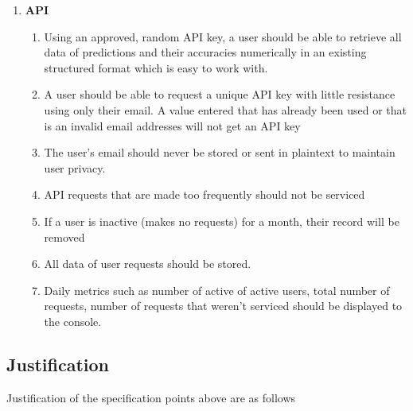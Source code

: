 \begin{enumerate}
        \item \textbf{API}
        
        \begin{enumerate}
            \item Using an approved, random API key, a user should be able to retrieve all data of predictions and their accuracies numerically in an existing structured format which is easy to work with.
            
            \item A user should be able to request a unique API key with little resistance using only their email. A value entered that has already been used or that is an invalid email addresses will not get an API key
            
            \item The user's email should never be stored or sent in plaintext to maintain user privacy.

            \item API requests that are made too frequently should not be serviced
            
            \item If a user is inactive (makes no requests) for a month, their record will be removed
            
            \item All data of user requests should be stored.
            
            \item Daily metrics such as number of active of active users, total number of requests, number of requests that weren't serviced should be displayed to the console.
        
        \end{enumerate}


        
    \end{enumerate}

        \subsection{Justification}
        Justification of the specification points above are as follows 

